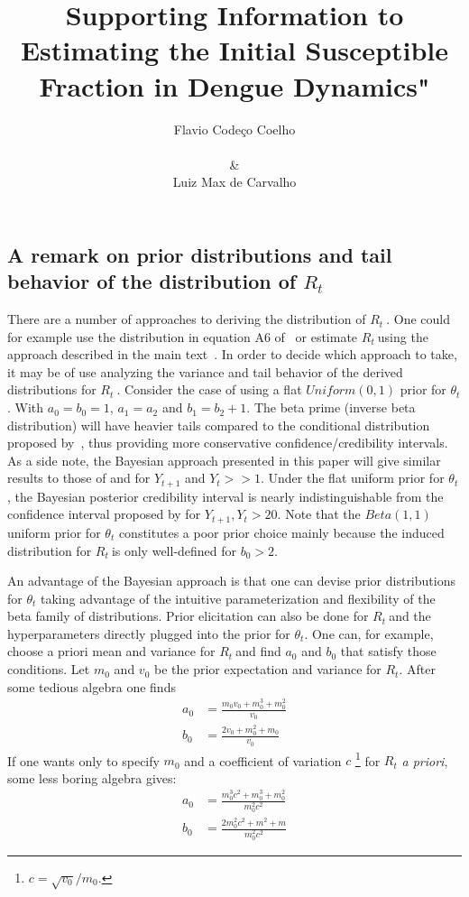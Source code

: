 \documentclass[12pt]{article}
\title{
Supporting Information to Estimating the Initial Susceptible Fraction in Dengue Dynamics"
}
\author{
Flavio Code\c{c}o Coelho \\
\\
\& \\
Luiz Max de Carvalho \\
}
\date{}
\def \rr {$R_{t}\ $}
\begin{document}
                                  
% 

%
\maketitle

\subsection*{A remark on prior distributions and tail behavior of the 
distribution of $R_t$}
\label{sec:tails}
There are a number of approaches to deriving the distribution of \rr.
One could for example  use the distribution in equation A6 of~\citet{nishiura} 
or estimate \rr using the approach described in the main text~\citep{mantel}.
In order to decide which approach to take, it may be of use analyzing the 
variance and tail behavior of the derived distributions for \rr. 
Consider the case of using a flat $Uniform(0, 1)$ prior for $\theta_t$.
With $a_0 = b_0 = 1$, $a_1 = a_2$ and $b_1 = b_2 + 1$.
The beta prime (inverse beta distribution) will have heavier tails compared to 
the conditional distribution proposed by~\citet{nishiura}, thus providing more 
conservative confidence/credibility intervals.  
As a side note, the Bayesian approach presented in this 
paper will give similar results to those of 
\citet{wilson} and \citet{wilson} for $Y_{t+1}$ and $Y_t >> 1$.
Under the flat  uniform prior for $\theta_t$, the Bayesian posterior credibility interval is nearly indistinguishable from the confidence interval proposed by \citet{clopper} for $Y_{t+1}, Y_t > 20$.
Note that the $Beta(1, 1)$ uniform prior for $\theta_t$ constitutes a poor prior choice mainly because the induced distribution for \rr is only well-defined for $b_0 > 2$.

An advantage of the Bayesian approach is that one can devise prior 
distributions for $\theta_t$ taking advantage of the intuitive parameterization 
and flexibility of the beta family of distributions.
Prior elicitation can also be done for \rr and the hyperparameters directly plugged into the prior for $\theta_t$. 
One can, for example, choose a priori mean and variance for \rr and find $a_0$ and $b_0$ that satisfy those conditions.
Let $m_0$ and $v_0$ be the prior expectation and variance for $R_t$. 
After some tedious algebra one finds
\begin{align}
\label{eq:elicitation}
a_0 &= \frac{m_0v_0 + m_0^3 + m_0^2}{v_0} \\
b_0 &= \frac{2v_0 + m_0^2 + m_0}{v_0}
\end{align}
If one wants only to specify $m_0$ and a coefficient of variation $c$ \footnote{$c = \sqrt{v_0}/ m_0$.} for $R_t$ \textit{a priori}, some less boring algebra gives:
\begin{align}
\label{eq:elicitationcv}
a_0 &= \frac{m_0^3c^2 + m_0^3 + m_0^2}{m_0^2c^2} \\
b_0 &= \frac{2m_0^2c^2 + m^2 + m}{m_0^2c^2}
\end{align}
\end{document}
